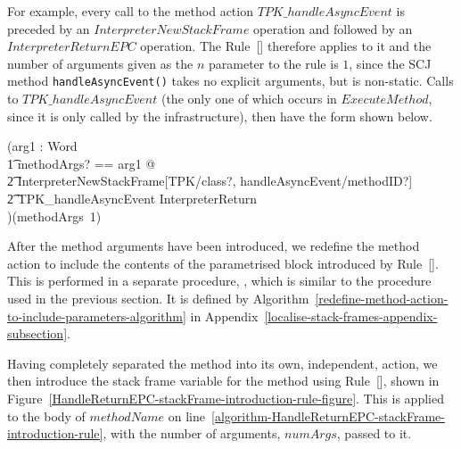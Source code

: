 For example, every call to the method action $TPK\_handleAsyncEvent$
is preceded by an $InterpreterNewStackFrame$ operation and followed by
an $InterpreterReturnEPC$ operation.
The Rule~[] therefore applies to
it and the number of arguments given as the $n$ parameter to the rule
is $1$, since the SCJ method \texttt{handleAsyncEvent()} takes no
explicit arguments, but is non-static.
Calls to $TPK\_handleAsyncEvent$ (the only one of which occurs in
$ExecuteMethod$, since it is only called by the infrastructure), then
have the form shown below.
\begin{circus}
  (\circval arg1 : Word \circspot \\
      \t1 \lschexpract \exists methodArgs? == \langle arg1 \rangle @ \\
      \t2 InterpreterNewStackFrame[TPK/class?, handleAsyncEvent/methodID?] \rschexpract \circseq \\
      \t2 TPK\_handleAsyncEvent \circseq \lschexpract InterpreterReturn \rschexpract \\
      )(methodArgs~1)
\end{circus}

After the method arguments have been introduced, we redefine the
method action to include the contents of the parametrised block
introduced by Rule~[].
This is performed in a separate procedure,
, which is similar to
the  procedure used
in the previous section.
It is defined by
Algorithm~\ref{redefine-method-action-to-include-parameters-algorithm}
in Appendix~\ref{localise-stack-frames-appendix-subsection}.

Having completely separated the method into its own, independent,
action, we then introduce the stack frame variable for the method
using Rule~[],
shown in
Figure~\ref{HandleReturnEPC-stackFrame-introduction-rule-figure}.
This is applied to the body of $methodName$ on
line~\ref{algorithm-HandleReturnEPC-stackFrame-introduction-rule},
with the number of arguments, $numArgs$, passed to it.

